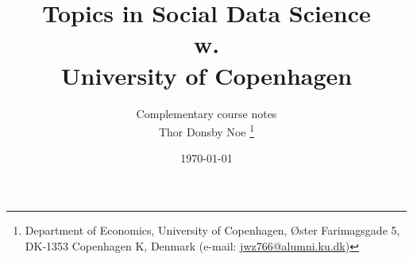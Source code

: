 
\title{\Huge Topics in Social Data Science \\ \Large w.  \\ \Large University of Copenhagen} %
\author{Complementary course notes \\ Thor Donsby Noe \thanks{Department of Economics, University of Copenhagen, Øster Farimagsgade 5, DK-1353 Copenhagen K, Denmark (e-mail: \href{mailto:jwz766@alumni.ku.dk}{jwz766@alumni.ku.dk})}
\\ [1ex]
}
\date{\today} %


%         
